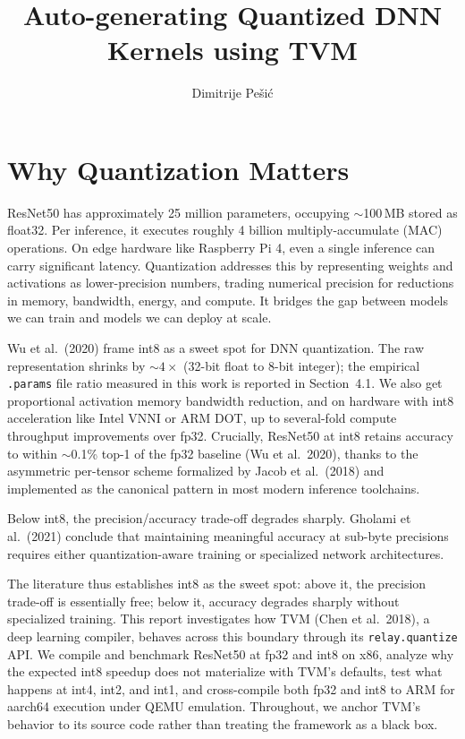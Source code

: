 \documentclass[11pt,a4paper]{article}
\title{Auto-generating Quantized DNN Kernels using TVM}
\author{Dimitrije Pe\v{s}i\'c}
\date{}
\begin{document}
\maketitle

\section{Why Quantization Matters}

ResNet50 has approximately 25 million parameters, occupying $\sim$100\,MB stored as float32. Per inference, it executes roughly 4 billion multiply-accumulate (MAC) operations. On edge hardware like Raspberry Pi 4, even a single inference can carry significant latency. Quantization addresses this by representing weights and activations as lower-precision numbers, trading numerical precision for reductions in memory, bandwidth, energy, and compute. It bridges the gap between models we can train and models we can deploy at scale.

Wu et al.\ (2020) frame int8 as a sweet spot for DNN quantization. The raw representation shrinks by ${\sim}4\times$ (32-bit float to 8-bit integer); the empirical \texttt{.params} file ratio measured in this work is reported in Section~4.1. We also get proportional activation memory bandwidth reduction, and on hardware with int8 acceleration like Intel VNNI or ARM DOT, up to several-fold compute throughput improvements over fp32. Crucially, ResNet50 at int8 retains accuracy to within $\sim$0.1\% top-1 of the fp32 baseline (Wu et al.\ 2020), thanks to the asymmetric per-tensor scheme formalized by Jacob et al.\ (2018) and implemented as the canonical pattern in most modern inference toolchains.

Below int8, the precision/accuracy trade-off degrades sharply. Gholami et al.\ (2021) conclude that maintaining meaningful accuracy at sub-byte precisions requires either quantization-aware training or specialized network architectures.

The literature thus establishes int8 as the sweet spot: above it, the precision trade-off is essentially free; below it, accuracy degrades sharply without specialized training. This report investigates how TVM (Chen et al.\ 2018), a deep learning compiler, behaves across this boundary through its \texttt{relay.quantize} API. We compile and benchmark ResNet50 at fp32 and int8 on x86, analyze why the expected int8 speedup does not materialize with TVM's defaults, test what happens at int4, int2, and int1, and cross-compile both fp32 and int8 to ARM for aarch64 execution under QEMU emulation. Throughout, we anchor TVM's behavior to its source code rather than treating the framework as a black box.
\end{document}
